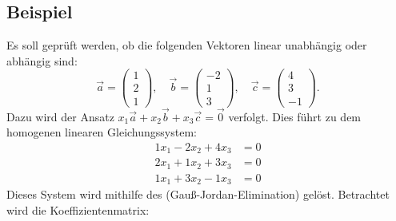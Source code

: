 \subsection*{Beispiel}
Es soll geprüft werden, ob die folgenden Vektoren linear unabhängig oder abhängig sind:
\[
    \vec{a} = \begin{pmatrix} 1 \\ 2 \\ 1 \end{pmatrix}, \quad \vec{b} = \begin{pmatrix} -2 \\ 1 \\ 3 \end{pmatrix}, \quad \vec{c} = \begin{pmatrix} 4 \\ 3 \\ -1 \end{pmatrix}.
\]
Dazu wird der Ansatz $x_1 \vec{a} + x_2 \vec{b} + x_3 \vec{c} = \vec{0}$ verfolgt. Dies führt zu dem homogenen linearen Gleichungssystem:
\begin{align*}
    1x_1 - 2x_2 + 4x_3 &= 0 \\
    2x_1 + 1x_2 + 3x_3 &= 0 \\
    1x_1 + 3x_2 - 1x_3 &= 0
\end{align*}
Dieses System wird mithilfe des  (Gauß-Jordan-Elimination) gelöst. Betrachtet wird die Koeffizientenmatrix:

